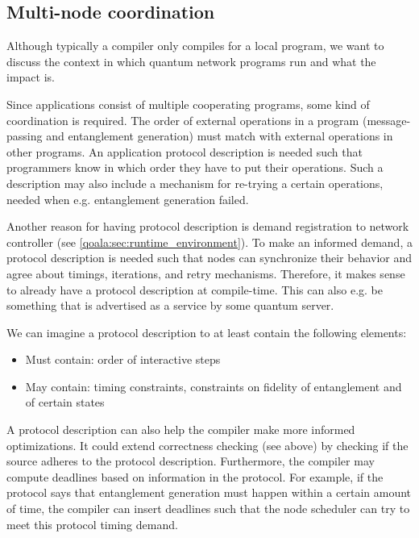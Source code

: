 \subsection{Multi-node coordination}
Although typically a compiler only compiles for a local program, we want to discuss the context in which quantum network programs run and what the impact is.

Since applications consist of multiple cooperating programs, some kind of coordination is required.
The order of external operations in a program (message-passing and entanglement generation) must match with external operations in other programs.
An application protocol description is needed such that programmers know in which order they have to put their operations.
Such a description may also include a mechanism for re-trying a certain operations, needed when e.g. entanglement generation failed.

Another reason for having protocol description is demand registration to network controller (see \cref{qoala:sec:runtime_environment}). To make an informed demand, a protocol description is needed such that nodes can synchronize their behavior and agree about timings, iterations, and retry mechanisms. Therefore, it makes sense to already have a protocol description at compile-time. This can also e.g. be something that is advertised as a service by some quantum server.

We can imagine a protocol description to at least contain the following elements:
\begin{itemize}
    \item Must contain: order of interactive steps
    \item May contain: timing constraints, constraints on fidelity of entanglement and of certain states
\end{itemize}

A protocol description can also help the compiler make more informed optimizations.
It could extend correctness checking (see above) by checking if the source adheres to the protocol description. 
Furthermore, the compiler may compute deadlines based on information in the protocol.
For example, if the protocol says that entanglement generation must happen within a certain amount of time, the compiler can insert deadlines such that the node scheduler can try to meet this protocol timing demand.


